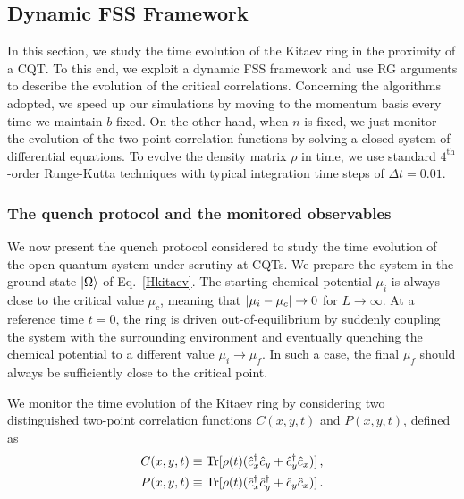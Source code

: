 \subsection{Dynamic FSS Framework}


In this section, we study the time evolution of the Kitaev ring in the proximity of a CQT. To this end, we exploit a dynamic FSS framework and use RG arguments to describe the evolution of the critical correlations. Concerning the algorithms adopted, we speed up our simulations by moving to the momentum basis every time we maintain $b$ fixed. On the other hand, when $n$ is fixed, we just monitor the evolution of the two-point correlation functions by solving a closed system of differential equations. To evolve the density matrix $\rho$ in time, we use standard $4^{\text{th}}$-order Runge-Kutta techniques with typical integration time steps of $\Delta t=0.01$.

\subsubsection{The quench protocol and the monitored observables}
\label{sec_observables}

We now present the quench protocol considered to study the time evolution of the open quantum system under scrutiny at CQTs. We prepare the system in the ground state $\ket{\Omega}$ of Eq.~\eqref{Hkitaev}. The starting chemical potential $\mu_i$ is always close to the critical value $\mu_c$, meaning that $\lvert\mu_i-\mu_c\rvert\to0$ for $L\to\infty$. At a reference time $t=0$, the ring is driven out-of-equilibrium by suddenly coupling the system with the surrounding environment and eventually quenching the chemical potential to a different value $\mu_i\to\mu_f$. In such a case, the final $\mu_f$ should always be sufficiently close to the critical point. 

We monitor the time evolution of the Kitaev ring by considering two distinguished two-point correlation functions $C(x, y, t)$ and $P(x, y, t)$, defined as
\begin{align}
	C(x, y, t)&\equiv{\rm Tr}[\rho(t)(\hat{c}^\dagger_x\hat{c}_y+\hat{c}^\dagger_y\hat{c}_x)]\,,\\
	P(x, y, t)&\equiv{\rm Tr}[\rho(t)(\hat{c}^\dagger_x\hat{c}^\dagger_y+\hat{c}_y\hat{c}_x)]\,.
    \label{eq_def_two_point_functions_C_P}
\end{align}


